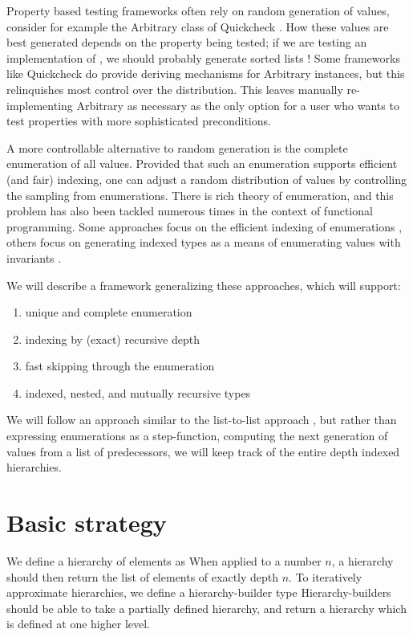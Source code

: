 Property based testing frameworks often rely on random generation of values, consider for example the Arbitrary class of Quickcheck \cite{quickcheck}. How these values are best generated depends on the property being tested; if we are testing an implementation of , we should probably generate sorted lists \cite{rest}! Some frameworks like Quickcheck do provide deriving mechanisms for Arbitrary instances, but this relinquishes most control over the distribution. This leaves manually re-implementing Arbitrary as necessary as the only option for a user who wants to test properties with more sophisticated preconditions.

A more controllable alternative to random generation is the complete enumeration of all values. Provided that such an enumeration supports efficient (and fair) indexing, one can adjust a random distribution of values by controlling the sampling from enumerations. There is rich theory of enumeration, and this problem has also been tackled numerous times in the context of functional programming. Some approaches focus on the efficient indexing of enumerations \cite{feat}, others focus on generating indexed types as a means of enumerating values with invariants \cite{uqenum}.

We will describe a framework generalizing these approaches, which will support:
\begin{enumerate}
    \item unique and complete enumeration
    \item indexing by (exact) recursive depth
    \item fast skipping through the enumeration
    \item indexed, nested, and mutually recursive types
\end{enumerate}

We will follow an approach similar to the list-to-list approach \cite{uqenum}, but rather than expressing enumerations as a step-function, computing the next generation of values from a list of predecessors, we will keep track of the entire depth indexed hierarchies.

\section{Basic strategy}
We define a hierarchy of elements as
When applied to a number $n$, a hierarchy should then return the list of elements of exactly depth $n$. To iteratively approximate hierarchies, we define a hierarchy-builder type
Hierarchy-builders should be able to take a partially defined hierarchy, and return a hierarchy which is defined at one higher level.

